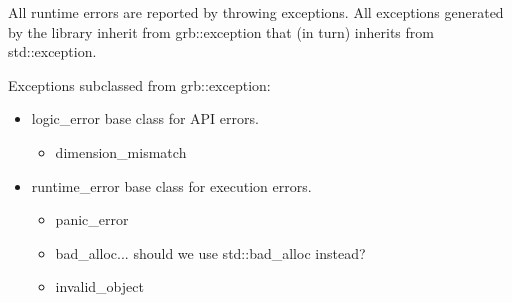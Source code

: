 All runtime errors are reported by throwing exceptions.  All exceptions generated
by the library inherit from {\sf grb::exception} that (in turn) inherits 
from {\sf std::exception}.

Exceptions subclassed from {\sf grb::exception}:

\begin{itemize}
\item {\sf logic\_error} base class for API errors.
    \begin{itemize}
    \item {\sf dimension\_mismatch}
    \end{itemize}
\item {\sf runtime\_error} base class for execution errors.
    \begin{itemize}
    \item {\sf panic\_error}
    \item {\sf bad\_alloc}... should we use {\sf std::bad\_alloc} instead?
    \item {\sf invalid\_object}
    \end{itemize}
\end{itemize}
